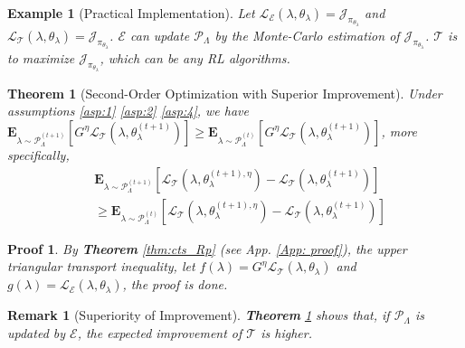 \documentclass[nohyperref]{article}
\theoremstyle{plain}
\newtheorem{Theorem}{\textbf{Theorem}}
\newtheorem*{Remark}{\textbf{Remark}}
\newtheorem*{Proof}{\textbf{Proof}}
\newtheorem{Example}{Example}
\begin{document}
\begin{Example}[Practical Implementation]
    Let $\mathcal{L}_{\mathcal{E}} (\lambda, \theta_{\lambda}) = \mathcal{J}_{\pi_{\theta_{\lambda}}}$ and $\mathcal{L}_{\mathcal{T}} (\lambda, \theta_{\lambda}) = \mathcal{J}_{\pi_{\theta_{\lambda}}}$.
    $\mathcal{E}$ can update $\mathcal{P}_{\Lambda}$ by the Monte-Carlo estimation of $\mathcal{J}_{\pi_{\theta_{\lambda}}}$.
    $\mathcal{T}$ is to maximize $\mathcal{J}_{\pi_{\theta_{\lambda}}}$, which can be any RL algorithms.
\end{Example}

\begin{Theorem}[Second-Order Optimization with Superior Improvement]
    Under assumptions \eqref{asp:1} \eqref{asp:2} \eqref{asp:4}, we have
    $\textbf{E}_{\lambda \sim \mathcal{P}_{\Lambda}^{(t+1)}}  [G^{\eta} \mathcal{L}_{\mathcal{T}} (\lambda, \theta_{\lambda}^{(t+1)})] 
    \geq \textbf{E}_{\lambda \sim \mathcal{P}_{\Lambda}^{(t)}}  [G^{\eta} \mathcal{L}_{\mathcal{T}} (\lambda, \theta_{\lambda}^{(t+1)})] $, more specifically,
   \begin{equation*}
       \begin{aligned}
               &\textbf{E}_{\lambda \sim \mathcal{P}_{\Lambda}^{(t+1)}}
    [\mathcal{L}_{\mathcal{T}} (\lambda, \theta_{\lambda}^{(t+1),\eta}) - \mathcal{L}_{\mathcal{T}} (\lambda, \theta_{\lambda}^{(t+1)}) ] \\
    &\geq \textbf{E}_{\lambda \sim \mathcal{P}_{\Lambda}^{(t)}}
    [\mathcal{L}_{\mathcal{T}} (\lambda, \theta_{\lambda}^{(t+1),\eta}) - \mathcal{L}_{\mathcal{T}} (\lambda, \theta_{\lambda}^{(t+1)}) ]
       \end{aligned}
   \end{equation*}
\label{thm:2nd_gdi}
\end{Theorem}

\begin{Proof}
    By \textbf{Theorem} \ref{thm:cts_Rp} (see App. \ref{App: proof}), the upper triangular transport inequality,
    let $f(\lambda) = G^{\eta} \mathcal{L}_{\mathcal{T}} (\lambda, \theta_{\lambda})$ and 
    $g(\lambda) = \mathcal{L}_{\mathcal{E}} (\lambda, \theta_{\lambda})$,
    the proof is done.
\end{Proof}

\begin{Remark}[Superiority of Improvement]
    \textbf{Theorem} \ref{thm:2nd_gdi} shows that, if $\mathcal{P}_{\Lambda}$ is updated by $\mathcal{E}$, the expected improvement of $\mathcal{T}$ is higher.
\end{Remark}
\end{document}
